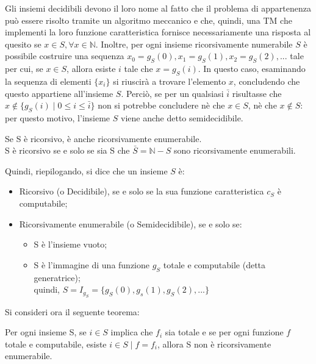   Gli insiemi decidibili devono il loro nome al fatto che il problema di appartenenza può essere risolto tramite un algoritmo meccanico e che, quindi, una TM che implementi la loro funzione caratteristica fornisce necessariamente una risposta al quesito se \(x\in S, \forall x \in \mathbb{N} \). Inoltre, per ogni insieme ricorsivamente numerabile \(S\) è possibile costruire una sequenza \(x_0=g_S(0), x_1=g_S(1), x_2=g_S(2),...\) tale per cui, se \(x\in S\), allora esiste \(i\) tale che \(x=g_S(i)\). In questo caso, esaminando la sequenza di elementi \(\{x_i\}\) si riuscirà a trovare l'elemento \(x\), concludendo che questo appartiene all'insieme \(S\). Perciò, se per un qualsiasi \(\bar{i}\) risultasse che \(x\notin\{g_S(i)\;|\;0\le i \le \bar{i}\}\) non si potrebbe concludere nè che \(x\in S\), nè che \(x\notin S\): per questo motivo, l'insieme \(S\) viene anche detto semidecidibile.

  \begin{theorem}
    Se S è ricorsivo, è anche ricorsivamente enumerabile. \\
    S è ricorsivo se e solo se sia S che \(\bar{S}=\mathbb{N}-S\) sono ricorsivamente enumerabili.
  \end{theorem}

  \break

  Quindi, riepilogando, si dice che un insieme \(S\) è:
  \begin{itemize}
    \item Ricorsivo (o Decidibile), se e solo se la sua funzione caratteristica \(c_S\) è computabile;
    \item Ricorsivamente enumerabile (o Semidecidibile), se e solo se:
    \begin{itemize}
      \item S è l'insieme vuoto;
      \item S è l'immagine di una funzione \(g_S\) totale e computabile (detta generatrice); \\ quindi, \(S=I_{g_S}=\{g_S(0), g_s(1), g_S(2),...\}\)
    \end{itemize}
  \end{itemize}

  Si consideri ora il seguente teorema:
  \begin{theorem}
    Per ogni insieme S, se \(i \in S\) implica che \(f_i\) sia totale e se per ogni funzione \(f\) totale e computabile, esiste \(i\in S\;|\;f=f_i\), allora S non è ricorsivamente enumerabile. 
  \end{theorem}

